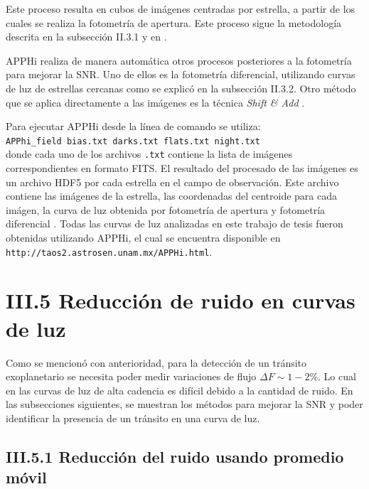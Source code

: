 Este proceso resulta en cubos de imágenes centradas por estrella, a partir de los cuales se realiza la fotometría de apertura. Este proceso sigue la metodología descrita en la subsección II.3.1 y en \cite{romanishin2006introduction}. 

APPHi realiza de manera automática otros procesos posteriores a la fotometría para mejorar la SNR. Uno de ellos es la fotometría diferencial, utilizando curvas de luz de estrellas cercanas como se explicó en la subsección II.3.2. Otro método que se aplica directamente a las imágenes es la técnica \textit{Shift \& Add} \cite{kluckers1996comparison}. 

Para ejecutar APPHi desde la línea de comando se utiliza:\\

\texttt{APPhi\_field bias.txt darks.txt flats.txt night.txt}\\

\noindent donde cada uno de los archivos \texttt{.txt} contiene la lista de imágenes correspondientes en formato FITS. El resultado del procesado de las imágenes es un archivo HDF5 por cada estrella en el campo de observación. Este archivo contiene las imágenes de la estrella, las coordenadas del centroide para cada imágen, la curva de luz obtenida por fotometría de apertura y fotometría diferencial \cite{sanchez2019apphi}. Todas las curvas de luz analizadas en este trabajo de tesis fueron obtenidas utilizando APPHi, el cual se encuentra disponible en \texttt{http://taos2.astrosen.unam.mx/APPHi.html}.

\section*{III.5 Reducción de ruido en curvas de luz}

Como se mencionó con anterioridad, para la detección de un tránsito exoplanetario se necesita poder medir variaciones de flujo $\Delta F \sim 1-2\%$. Lo cual en las curvas de luz de alta cadencia es difícil debido a la cantidad de ruido. En las subsecciones siguientes, se muestran los métodos para mejorar la SNR y poder identificar la presencia de un tránsito en una curva de luz.

\subsection*{III.5.1 Reducción del ruido usando promedio móvil}

